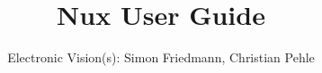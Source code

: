 \documentclass[oneside]{scrbook}
\title{Nux User Guide}
\author{Electronic Vision(s): Simon Friedmann, Christian Pehle}
\begin{document}
	\maketitle
    \dominitoc
    \tableofcontents

    
    
    


    
    
    
    
    
\end{document}
